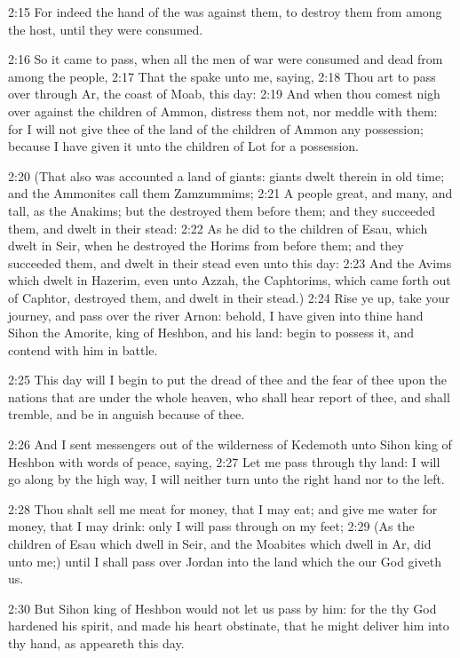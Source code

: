 2:15 For indeed the hand of the \LORD was against them, to destroy them
from among the host, until they were consumed.

2:16 So it came to pass, when all the men of war were consumed and
dead from among the people, 2:17 That the \LORD spake unto me, saying,
2:18 Thou art to pass over through Ar, the coast of Moab, this day:
2:19 And when thou comest nigh over against the children of Ammon,
distress them not, nor meddle with them: for I will not give thee of
the land of the children of Ammon any possession; because I have given
it unto the children of Lot for a possession.

2:20 (That also was accounted a land of giants: giants dwelt therein
in old time; and the Ammonites call them Zamzummims; 2:21 A people
great, and many, and tall, as the Anakims; but the \LORD destroyed them
before them; and they succeeded them, and dwelt in their stead: 2:22
As he did to the children of Esau, which dwelt in Seir, when he
destroyed the Horims from before them; and they succeeded them, and
dwelt in their stead even unto this day: 2:23 And the Avims which
dwelt in Hazerim, even unto Azzah, the Caphtorims, which came forth
out of Caphtor, destroyed them, and dwelt in their stead.)  2:24 Rise
ye up, take your journey, and pass over the river Arnon: behold, I
have given into thine hand Sihon the Amorite, king of Heshbon, and his
land: begin to possess it, and contend with him in battle.

2:25 This day will I begin to put the dread of thee and the fear of
thee upon the nations that are under the whole heaven, who shall hear
report of thee, and shall tremble, and be in anguish because of thee.

2:26 And I sent messengers out of the wilderness of Kedemoth unto
Sihon king of Heshbon with words of peace, saying, 2:27 Let me pass
through thy land: I will go along by the high way, I will neither turn
unto the right hand nor to the left.

2:28 Thou shalt sell me meat for money, that I may eat; and give me
water for money, that I may drink: only I will pass through on my
feet; 2:29 (As the children of Esau which dwell in Seir, and the
Moabites which dwell in Ar, did unto me;) until I shall pass over
Jordan into the land which the \LORD our God giveth us.

2:30 But Sihon king of Heshbon would not let us pass by him: for the
\LORD thy God hardened his spirit, and made his heart obstinate, that
he might deliver him into thy hand, as appeareth this day.

